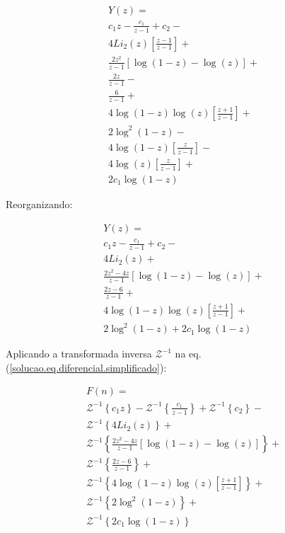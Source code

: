 \documentclass[a4paper,10pt]{article}
\begin{document}
$$
\begin{array}{lcl} 
 Y(z) = \\
 c_1z - \displaystyle \frac{c_1}{z-1}+ c_2-\\
 4 Li_2(z)\left[\displaystyle \frac{z - 1}{z-1}\right]+\\
 \displaystyle \frac{2 z^2 }{z-1}\displaystyle \left[\log(1-z) - \log(z)\right]+\\
 \displaystyle \frac{2 z}{z-1}-\\
 \displaystyle \frac{6}{z-1}+\\
 4 \log(1-z)\log(z) \left[\displaystyle \frac{ z  + 1}{z-1}\right]+\\
 2 \log^2(1-z) - \\
 4 \log(1-z) \left[\displaystyle \frac{ z }{z-1}\right]-\\
 4 \log(z)\left[\displaystyle \frac{ z }{z-1}\right] + \\
 2 c_1  \log(1-z)
\end{array}
$$

Reorganizando:

\begin{equation}
\begin{array}{lcl} 
 Y(z) = \\
 c_1z - \displaystyle \frac{c_1}{z-1}+  c_2-\\
 4 Li_2(z) +\\
 \displaystyle \frac{2 z^2 - 4z}{z-1}\displaystyle \left[\log(1-z) - \log(z)\right] +\\
 \displaystyle \frac{2 z - 6}{z-1}+\\
 4 \log(1-z)\log(z) \left[\displaystyle \frac{ z  + 1}{z-1}\right]+\\
 2 \log^2(1-z) + 2 c_1  \log(1-z)
\end{array} 
\label{solucao.eq.diferencial.simplificado}
\end{equation}


Aplicando a transformada  inversa $\mathcal{Z}^{-1}$ na eq. (\ref{solucao.eq.diferencial.simplificado}):


$$
\begin{array}{lcl} 
 F(n) = \\
 \mathcal{Z}^{-1}\left\{c_1z\right\} - 
 \mathcal{Z}^{-1}\left\{\displaystyle \frac{c_1}{z-1}\right\} + 
 \mathcal{Z}^{-1}\left\{c_2\right\}-\\
 \mathcal{Z}^{-1}\left\{4 Li_2(z)\right\}+\\
 \mathcal{Z}^{-1}\left\{\displaystyle \frac{2 z^2 - 4z}{z-1}\displaystyle \left[\log(1-z) - \log(z)\right]\right\} +\\
 \mathcal{Z}^{-1}\left\{\displaystyle \frac{2 z - 6}{z-1}\right\}+\\
 \mathcal{Z}^{-1}\left\{4 \log(1-z)\log(z) \left[\displaystyle \frac{ z  + 1}{z-1}\right]\right\}+\\
 \mathcal{Z}^{-1}\left\{2 \log^2(1-z)\right\} + \\
 \mathcal{Z}^{-1}\left\{2 c_1  \log(1-z)\right\} 
\end{array} 
$$
\end{document}
